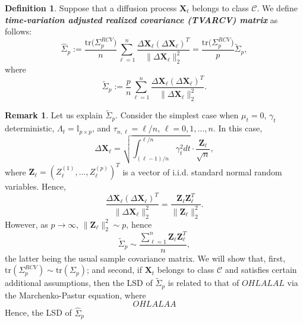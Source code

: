 \documentclass[a4paper,11pt]{article}
\theoremstyle{plain}
\theoremstyle{definition}
\newtheorem{defn}[thm]{Definition}
\newtheorem{rmrk}[thm]{Remark}
\newcommand{\tr}{\mathrm{tr}}
\newcommand{\define}[1]{\textit{\textbf{#1}}}
\begin{document}
    \begin{defn}
   		Suppose that a diffusion process $\mathbf{X}_t$ belongs to class $\mathcal{C}$. We define \define{time-variation adjusted realized covariance (TVARCV) matrix} as follows:
   		\begin{equation} \label{TVARCV}
   		\widehat{\Sigma}_p := \frac{\tr \big( \Sigma_p^{RCV} \big) }{n} \sum_{\ell = 1}^{n} \frac{\Delta \mathbf{X}_\ell (\Delta \mathbf{X}_\ell)^T}{\| \Delta \mathbf{X}_\ell \|_2^2} = \frac{\tr \big( \Sigma_p^{RCV} \big) }{p} \widetilde{\Sigma}_p,
   		\end{equation}
   		where
   		\begin{equation} \label{Sigma_tilde}
   		\widetilde{\Sigma}_p := \frac{p}{n} \sum_{\ell = 1}^{n} \frac{\Delta \mathbf{X}_\ell (\Delta \mathbf{X}_\ell)^T}{\| \Delta \mathbf{X}_\ell \|_2^2}.
   		\end{equation}
    \end{defn}
    
    \begin{rmrk}
    	Let us explain $\widetilde{\Sigma}_p$. Consider the simplest case when $\mu_t = 0$, $\gamma_t$ deterministic, $\Lambda_t = \mathbb{I}_{p \times p}$, and $\tau_{n,\ell} = \ell / n$, $\ell = 0, 1, \dots, n$. In this case,
    	\[ \Delta \mathbf{X}_\ell = \sqrt{\int_{(\ell - 1)/n}^{\ell / n} \gamma_t^2 dt }\cdot \frac{\mathbf{Z}_\ell}{\sqrt{n}}, \]
    	where $\mathbf{Z}_\ell = (Z_\ell^{(1)}, \dots, Z_\ell^{(p)})^T$ is a vector of i.i.d. standard normal random variables. Hence,
    	\[ \frac{\Delta \mathbf{X}_\ell (\Delta \mathbf{X}_\ell)^T}{\| \Delta \mathbf{X}_\ell \|_2^2} = \frac{\mathbf{Z}_\ell \mathbf{Z}_\ell^T}{\|  \mathbf{Z}_\ell \|_2^2}. \]
    	However, as $p \rightarrow \infty$, $\| \mathbf{Z}_\ell \|_2^2 \sim p$, hence
    	\[ \widetilde{\Sigma}_p \sim \frac{\sum_{\ell = 1}^{n}\mathbf{Z}_\ell \mathbf{Z}_\ell^T}{n}, \]
    	the latter being the usual sample covariance matrix.
    	We will show that, first, $\tr(\Sigma_p^{RCV}) \sim \tr(\Sigma_p)$; and second, if $\mathbf{X}_t$ belongs to class $\mathcal{C}$ and satisfies certain additional assumptions, then the LSD of $\widetilde{\Sigma}_p$ is related to that of $OHLALAL$ via the Marchenko-Pastur equation, where
    	\[ OHLALAA \]
    	Hence, the LSD of $\widehat{\Sigma}_p$
    \end{rmrk}
    
\end{document}
